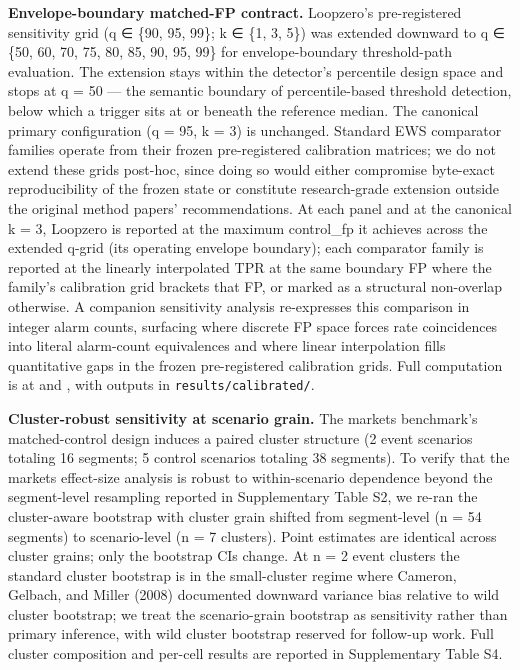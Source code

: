 \documentclass[
  11pt,
]{article}
\begin{document}
\textbf{Envelope-boundary matched-FP contract.} Loopzero's
pre-registered sensitivity grid (q ∈ \{90, 95, 99\}; k ∈ \{1, 3, 5\})
was extended downward to q ∈ \{50, 60, 70, 75, 80, 85, 90, 95, 99\} for
envelope-boundary threshold-path evaluation. The extension stays within
the detector's percentile design space and stops at q = 50 --- the
semantic boundary of percentile-based threshold detection, below which a
trigger sits at or beneath the reference median. The canonical primary
configuration (q = 95, k = 3) is unchanged. Standard EWS comparator
families operate from their frozen pre-registered calibration matrices;
we do not extend these grids post-hoc, since doing so would either
compromise byte-exact reproducibility of the frozen state or constitute
research-grade extension outside the original method papers'
recommendations. At each panel and at the canonical k = 3, Loopzero is
reported at the maximum control\_fp it achieves across the extended
q-grid (its operating envelope boundary); each comparator family is
reported at the linearly interpolated TPR at the same boundary FP where
the family's calibration grid brackets that FP, or marked as a
structural non-overlap otherwise. A companion sensitivity analysis
re-expresses this comparison in integer alarm counts, surfacing where
discrete FP space forces rate coincidences into literal alarm-count
equivalences and where linear interpolation fills quantitative gaps in
the frozen pre-registered calibration grids. Full computation is at
\texttt{} and
\texttt{}, with outputs
in \texttt{results/calibrated/}.

\textbf{Cluster-robust sensitivity at scenario grain.} The markets
benchmark's matched-control design induces a paired cluster structure (2
event scenarios totaling 16 segments; 5 control scenarios totaling 38
segments). To verify that the markets effect-size analysis is robust to
within-scenario dependence beyond the segment-level resampling reported
in Supplementary Table S2, we re-ran the cluster-aware bootstrap with
cluster grain shifted from segment-level (n = 54 segments) to
scenario-level (n = 7 clusters). Point estimates are identical across
cluster grains; only the bootstrap CIs change. At n = 2 event clusters
the standard cluster bootstrap is in the small-cluster regime where
Cameron, Gelbach, and Miller (2008) documented downward variance bias
relative to wild cluster bootstrap; we treat the scenario-grain
bootstrap as sensitivity rather than primary inference, with wild
cluster bootstrap reserved for follow-up work. Full cluster composition
and per-cell results are reported in Supplementary Table S4.
\end{document}

